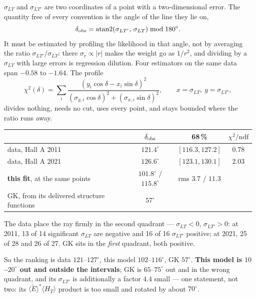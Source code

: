 \documentclass[11pt,a4paper]{article}
\newcommand{\sig}[1]{\sigma_{#1}}
\begin{document}
$\sig{LT}$ and $\sig{LT'}$ are two coordinates of a point with a
two-dimensional error.  The quantity free of every convention is the angle of
the line they lie on,
\begin{equation}
\delta_{\rm obs} = \mathrm{atan2}(\sig{LT'},\,\sig{LT}) \bmod 180^\circ .
\label{eq:deltaobs}
\end{equation}
It must be estimated by profiling the likelihood in that angle, not by
averaging the ratio $\sig{LT'}/\sig{LT}$: there $\sigma_r \propto |r|$ makes the
weight go as $1/r^2$, and dividing by a $\sig{LT}$ with large errors is
regression dilution.  Four estimators on the same data span $-0.58$ to $-1.64$.
The profile
\begin{equation}
\chi^2(\delta) = \sum_i
\frac{(y_i\cos\delta - x_i\sin\delta)^2}
     {(\sigma_{y,i}\cos\delta)^2 + (\sigma_{x,i}\sin\delta)^2},
\qquad x = \sig{LT},\ y = \sig{LT'},
\end{equation}
divides nothing, needs no cut, uses every point, and stays bounded where the
ratio runs away.

\begin{center}
\begin{tabular}{lccc}
\toprule
& $\delta_{\rm obs}$ & 68\,\% & $\chi^2/\mathrm{ndf}$\\
\midrule
data, Hall A 2011 & $121.4^\circ$ & $[116.3, 127.2]$ & 0.78\\
data, Hall A 2021 & $126.6^\circ$ & $[123.1, 130.1]$ & 2.03\\
\textbf{this fit}, at the same points & $101.8^\circ$ / $115.8^\circ$ & rms $3.7$ / $11.3$ & \\
GK, from its delivered structure functions & $57^\circ$ & & \\
\bottomrule
\end{tabular}
\end{center}

The data place the ray firmly in the second quadrant --- $\sig{LT} < 0$,
$\sig{LT'} > 0$: at 2011, 13 of 14 significant $\sig{LT}$ are negative and 16
of 16 $\sig{LT'}$ positive; at 2021, 25 of 28 and 26 of 27.  GK sits in the
\emph{first} quadrant, both positive.

So the ranking is data $121$--$127^\circ$, this model $102$--$116^\circ$, GK
$57^\circ$.  \textbf{This model is $10$--$20^\circ$ out and outside the
intervals}; GK is $65$--$75^\circ$ out and in the wrong quadrant, and its
$\sig{LT'}$ is additionally a factor $4.4$ small --- one statement, not two:
its $\langle\tilde E\rangle^{*}\langle H_T\rangle$ product is too small and
rotated by about $70^\circ$.
\end{document}

